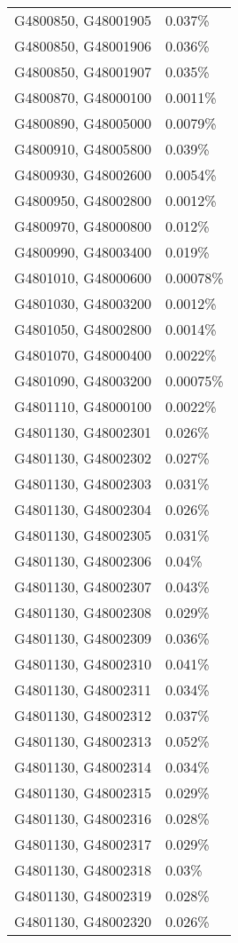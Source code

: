 \begin{longtable}[]{@{}ll@{}}
G4800850, G48001905 & 0.037\% \\
G4800850, G48001906 & 0.036\% \\
G4800850, G48001907 & 0.035\% \\
G4800870, G48000100 & 0.0011\% \\
G4800890, G48005000 & 0.0079\% \\
G4800910, G48005800 & 0.039\% \\
G4800930, G48002600 & 0.0054\% \\
G4800950, G48002800 & 0.0012\% \\
G4800970, G48000800 & 0.012\% \\
G4800990, G48003400 & 0.019\% \\
G4801010, G48000600 & 0.00078\% \\
G4801030, G48003200 & 0.0012\% \\
G4801050, G48002800 & 0.0014\% \\
G4801070, G48000400 & 0.0022\% \\
G4801090, G48003200 & 0.00075\% \\
G4801110, G48000100 & 0.0022\% \\
G4801130, G48002301 & 0.026\% \\
G4801130, G48002302 & 0.027\% \\
G4801130, G48002303 & 0.031\% \\
G4801130, G48002304 & 0.026\% \\
G4801130, G48002305 & 0.031\% \\
G4801130, G48002306 & 0.04\% \\
G4801130, G48002307 & 0.043\% \\
G4801130, G48002308 & 0.029\% \\
G4801130, G48002309 & 0.036\% \\
G4801130, G48002310 & 0.041\% \\
G4801130, G48002311 & 0.034\% \\
G4801130, G48002312 & 0.037\% \\
G4801130, G48002313 & 0.052\% \\
G4801130, G48002314 & 0.034\% \\
G4801130, G48002315 & 0.029\% \\
G4801130, G48002316 & 0.028\% \\
G4801130, G48002317 & 0.029\% \\
G4801130, G48002318 & 0.03\% \\
G4801130, G48002319 & 0.028\% \\
G4801130, G48002320 & 0.026\% \\

\end{longtable}
